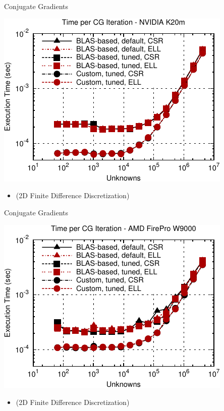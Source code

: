 \begin{frame}[fragile]{Conjugate Gradients}
 \begin{block}{}
 \begin{center}
  \vspace*{-0.5cm}
  \includegraphics[width=0.85\textwidth]{figures/cg-k20m-3}
 \end{center}

 \begin{itemize}
  \item   \vspace*{-0.3cm} {\small (2D Finite Difference Discretization)}
 \end{itemize}
 \end{block}   
\end{frame}


\begin{frame}[fragile]{Conjugate Gradients}
 \begin{block}{}
 \begin{center}
  \vspace*{-0.5cm}
  \includegraphics[width=0.85\textwidth]{figures/cg-firepro-w9000-3}
 \end{center}

 \begin{itemize}
  \item   \vspace*{-0.3cm} {\small (2D Finite Difference Discretization)}
 \end{itemize}
 \end{block}   
\end{frame}

